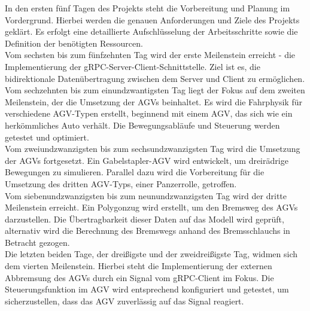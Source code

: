 In den ersten fünf Tagen des Projekts steht die Vorbereitung und Planung im Vordergrund. Hierbei werden die genauen Anforderungen und Ziele des Projekts geklärt. Es erfolgt eine detaillierte Aufschlüsselung der Arbeitsschritte sowie die Definition der benötigten Ressourcen.\\
Vom sechsten bis zum fünfzehnten Tag wird der erste Meilenstein erreicht - die Implementierung der gRPC-Server-Client-Schnittstelle. Ziel ist es, die bidirektionale Datenübertragung zwischen dem Server und Client zu ermöglichen.\\
Vom sechzehnten bis zum einundzwantigsten Tag liegt der Fokus auf dem zweiten Meilenstein, der die Umsetzung der AGVs beinhaltet. Es wird die Fahrphysik für verschiedene AGV-Typen erstellt, beginnend mit einem AGV, das sich wie ein herkömmliches Auto verhält. Die Bewegungsabläufe und Steuerung werden getestet und optimiert.\\
Vom zweiundzwanzigsten bis zum sechsundzwanzigsten Tag wird die Umsetzung der AGVs fortgesetzt. Ein Gabelstapler-AGV wird entwickelt, um dreirädrige Bewegungen zu simulieren. Parallel dazu wird die Vorbereitung für die Umsetzung des dritten AGV-Typs, einer Panzerrolle, getroffen.\\
Vom siebenundzwanzigsten bis zum neunundzwanzigsten Tag wird der dritte Meilenstein erreicht. Ein Polygonzug wird erstellt, um den Bremsweg des AGVs darzustellen. Die Übertragbarkeit dieser Daten auf das Modell wird geprüft, alternativ wird die Berechnung des Bremswegs anhand des Bremsschlauchs in Betracht gezogen.\\
Die letzten beiden Tage, der dreißigste und der zweidreißigste Tag, widmen sich dem vierten Meilenstein. Hierbei steht die Implementierung der externen Abbremsung des AGVs durch ein Signal vom gRPC-Client im Fokus. Die Steuerungsfunktion im AGV wird entsprechend konfiguriert und getestet, um sicherzustellen, dass das AGV zuverlässig auf das Signal reagiert.\\

